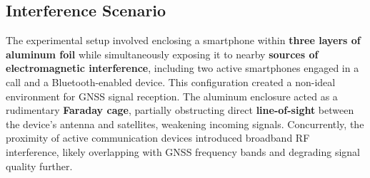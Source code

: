 
    \subsection{Interference Scenario}
    
        The experimental setup involved enclosing a smartphone within \textbf{three layers of aluminum foil} while simultaneously exposing it to nearby \textbf{sources of electromagnetic interference}, including two active smartphones engaged in a call and a Bluetooth-enabled device. 
        This configuration created a non-ideal environment for GNSS signal reception. 
        The aluminum enclosure acted as a rudimentary \textbf{Faraday cage}, partially obstructing direct \textbf{line-of-sight} between the device's antenna and satellites, weakening incoming signals. 
        Concurrently, the proximity of active communication devices introduced broadband RF interference, likely overlapping with GNSS frequency bands and degrading signal quality further.
